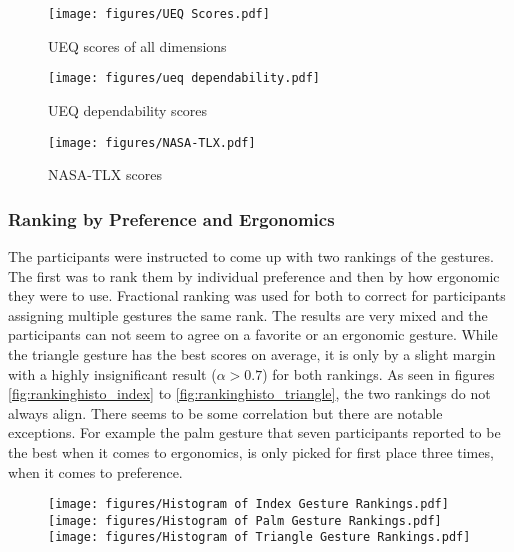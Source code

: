 \begin{figure}[!ht]
    \centering
    \texttt{[image: figures/UEQ Scores.pdf]}
    \caption{UEQ scores of all dimensions}
    \label{fig:ueqDimensions}
\end{figure}

\begin{figure}[!ht]
    \centering
    \texttt{[image: figures/ueq dependability.pdf]}
    \caption{UEQ dependability scores}
    \label{fig:ueqDependability}
\end{figure}

\begin{figure}[!ht]
    \centering
    \texttt{[image: figures/NASA-TLX.pdf]}
    \caption{NASA-TLX scores}
    \label{fig:ueqDependability}
\end{figure}

\subsubsection{Ranking by Preference and Ergonomics}
The participants were instructed to come up with two rankings of the gestures. The first was to rank them by individual preference and then by how ergonomic they were to use. Fractional ranking was used for both to correct for participants assigning multiple gestures the same rank. The results are very mixed and the participants can not seem to agree on a favorite or an ergonomic gesture. While the triangle gesture has the best scores on average, it is only by a slight margin with a highly insignificant result ($\alpha > 0.7$) for both rankings. As seen in figures \ref{fig:rankinghisto_index} to \ref{fig:rankinghisto_triangle}, the two rankings do not always align. There seems to be some correlation but there are notable exceptions. For example the palm gesture that seven participants reported to be the best when it comes to ergonomics, is only picked for first place three times, when it comes to preference. 

\begin{figure}[!htb]
        \texttt{[image: figures/Histogram of Index Gesture Rankings.pdf]}
        \label{fig:rankinghisto_index}
    \endminipage\hfill
        \texttt{[image: figures/Histogram of Palm Gesture Rankings.pdf]}
        \label{fig:rankinghisto_palm}
    \endminipage\hfill
        \texttt{[image: figures/Histogram of Triangle Gesture Rankings.pdf]}
        \label{fig:rankinghisto_triangle}
        \label{fig:exp2maps}
    \endminipage
\end{figure}
    

